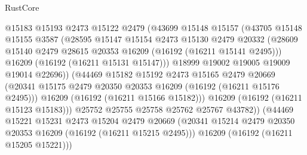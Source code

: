 \begin{lexlean}{RustCore}
\begin{coremodule}
                          @15183
                          @15193
                          @2473
                          @15122
                          @2479
                          (@43699
                            @15148
                            @15157
                            (@43705
                              @15148
                              @15155
                              @3587
                              (@28595
                                @15147
                                @15154
                                @2473
                                @15130
                                @2479
                                @20332
                                (@28609
                                  @15140
                                  @2479
                                  @28615
                                  @20353
                                  @16209
                                  (@16192 (@16211 @15141 @2495)))
                                @16209
                                (@16192 (@16211 @15131 @15147)))
                              @18999
                              @19002
                              @19005
                              @19009
                              @19014
                              @22696))
                          (@44469
                            @15182
                            @15192
                            @2473
                            @15165
                            @2479
                            @20669
                            (@20341
                              @15175
                              @2479
                              @20350
                              @20353
                              @16209
                              (@16192 (@16211 @15176 @2495)))
                            @16209
                            (@16192 (@16211 @15166 @15182)))
                          @16209
                          (@16192 (@16211 @15123 @15183)))
                        @25752
                        @25755
                        @25758
                        @25762
                        @25767
                        @43782))
                    (@44469
                      @15221
                      @15231
                      @2473
                      @15204
                      @2479
                      @20669
                      (@20341 @15214 @2479 @20350 @20353 @16209 (@16192 (@16211 @15215 @2495)))
                      @16209
                      (@16192 (@16211 @15205 @15221)))

\end{coremodule}
\end{lexlean}
